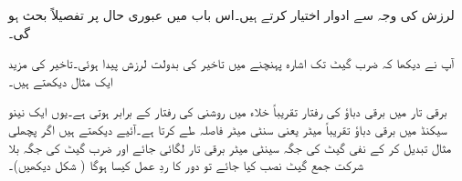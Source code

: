  لرزش کی وجہ سے ادوار   اختیار کرتے ہیں۔اس باب میں عبوری حال پر تفصیلاً بحث ہو گی۔ 

آپ نے دیکھا کہ ضرب گیٹ تک اشارہ  پہنچنے میں تاخیر کی بدولت لرزش پیدا ہوئی۔تاخیر کی مزید ایک مثال دیکھتے ہیں۔

برقی تار میں برقی دباؤ کی رفتار تقریباً خلاء میں روشنی کی رفتار کے برابر ہوتی ہے۔یوں ایک نینو سیکنڈ میں برقی دباؤ تقریباً  میٹر یعنی  سنٹی میٹر فاصلہ طے کرتا ہے۔آئیے دیکھتے ہیں اگر پچھلی مثال تبدیل کر کے نفی گیٹ کی جگہ  سینٹی میٹر برقی تار لگائی جائے اور ضرب گیٹ کی جگہ بلا شرکت جمع گیٹ نصب کیا جائے تو دور کا ردِ عمل کیسا ہوگا ( شکل  دیکھیں)۔


